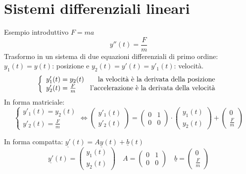 \documentclass{scrreprt}
\begin{document}
\section{Sistemi differenziali lineari}
Esempio introduttivo $F=ma$
\begin{equation}
	y''(t) = \frac{F}{m}
\end{equation}
Trasformo in un sistema di due equazioni differenziali di primo ordine:\\
$ y_1(t) = y(t)$: posizione e $y_2(t) = y'(t) = y'_1(t)$: velocità.\\
$$ \left\{\begin{array}{lr} y'_1(t)=y_2(t) \quad \quad \textnormal{la velocità è la derivata della posizione}\\ y'_2(t)=\frac{F}{m} \quad \quad \textnormal{l'accelerazione è la derivata della velocità}\end{array}\right. $$
In forma matriciale:
\begin{equation}
	\left\{\begin{array}{c} y'_1(t) = y_2(t) \\ y'_2(t)= \frac{F}{m} \end{array}\right.
	\Leftrightarrow \left(\begin{array}{c} y'_1(t) \\ y'_2(t) \end{array}\right)
	= \left(\begin{array}{cc} 0 & 1 \\ 0 & 0 \end{array}\right)
	\cdot \left(\begin{array}{c} y_1(t) \\ y_2(t) \end{array}\right)
	+ \left(\begin{array}{c} 0 \\ \frac{F}{m} \end{array}\right)
\end{equation}



In forma compatta:
$\underline{y'}(t) = A\underline{y}(t)+\underline{b}(t)$\\
\begin{equation}
	\underline{y'}(t) = \begin{pmatrix} y_1(t) \\ y_2(t) \end{pmatrix} \quad A = \begin{pmatrix} 0 & 1 \\ 0 & 0 \end{pmatrix} \quad \underline{b} =\begin{pmatrix} 0 \\ \frac{F}{m} \end{pmatrix}
\end{equation}
\end{document}
